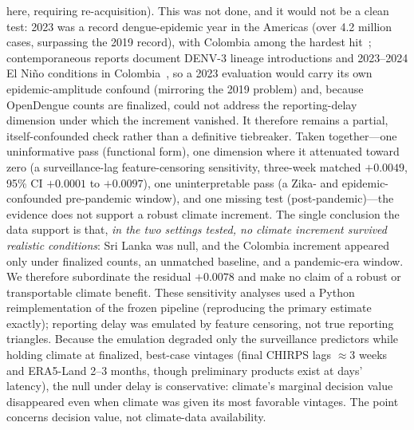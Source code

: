 \documentclass[11pt,a4paper]{article}
\begin{document}
here, requiring re-acquisition). This was not done, and it would not be a clean test: 2023 was a record dengue-epidemic year in the Americas (over 4.2 million cases, surpassing the 2019 record), with Colombia among the hardest hit~\cite{PAHO2023}; contemporaneous reports document DENV-3 lineage introductions and 2023--2024 El Ni\~no conditions in Colombia~\cite{ValleDelCauca2024}, so a 2023 evaluation would carry its own epidemic-amplitude confound (mirroring the 2019 problem) and, because OpenDengue counts are finalized, could not address the reporting-delay dimension under which the increment vanished. It therefore remains a partial, itself-confounded check rather than a definitive tiebreaker. Taken together---one uninformative pass (functional form), one dimension where it attenuated toward zero (a surveillance-lag feature-censoring sensitivity, three-week matched $+0.0049$, 95\% CI $+0.0001$ to $+0.0097$), one uninterpretable pass (a Zika- and epidemic-confounded pre-pandemic window), and one missing test (post-pandemic)---the evidence does not support a robust climate increment. The single conclusion the data support is that, \emph{in the two settings tested, no climate increment survived realistic conditions}: Sri Lanka was null, and the Colombia increment appeared only under finalized counts, an unmatched baseline, and a pandemic-era window. We therefore subordinate the residual $+0.0078$ and make no claim of a robust or transportable climate benefit. These sensitivity analyses used a Python reimplementation of the frozen pipeline (reproducing the primary estimate exactly); reporting delay was emulated by feature censoring, not true reporting triangles. Because the emulation degraded only the surveillance predictors while holding climate at finalized, best-case vintages (final CHIRPS lags $\approx$3 weeks and ERA5-Land 2--3 months, though preliminary products exist at days' latency), the null under delay is conservative: climate's marginal decision value disappeared even when climate was given its most favorable vintages. The point concerns decision value, not climate-data availability.
\end{document}
